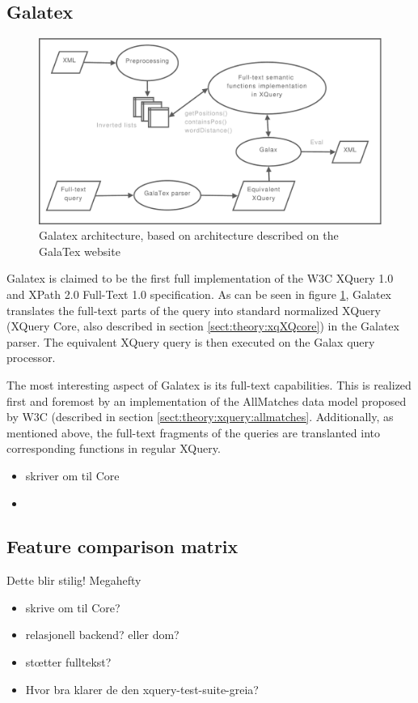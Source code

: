 \subsection{Galatex}
\begin{figure}[h]
  \centering
    \includegraphics[width=1\textwidth]{diagrams/galatex_arch}
  \caption[GalaTex architecture]{Galatex architecture, based on architecture described on
  the GalaTex website\cite{galatex}}
  \label{figure:galatex:arch}
\end{figure}
Galatex is claimed to be the first full implementation of the W3C XQuery 1.0 
and XPath 2.0 Full-Text 1.0 specification\cite{w3c01}. As can be seen in figure
\ref{figure:galatex:arch}, Galatex translates the full-text parts of the query
into standard normalized XQuery (XQuery Core\cite{xquery_semantics}, also
described in section \ref{sect:theory:xqXQcore}) in the Galatex parser. The equivalent
XQuery query is then executed on the Galax query processor.

The most interesting aspect of Galatex is its full-text capabilities. This is
realized first and foremost by an implementation of the AllMatches data model
proposed by W3C (described in section \ref{sect:theory:xquery:allmatches}.
Additionally, as mentioned above, the full-text fragments of the queries are
translanted into corresponding functions in regular XQuery. 

\begin{itemize}
    \item skriver om til Core
    \item 
\end{itemize}

\subsection{Feature comparison matrix}
Dette blir stilig! Megahefty
\begin{itemize}
    \item skrive om til Core?
    \item relasjonell backend? eller dom?
    \item st\oe tter fulltekst?
    \item Hvor bra klarer de den xquery-test-suite-greia?
\end{itemize}